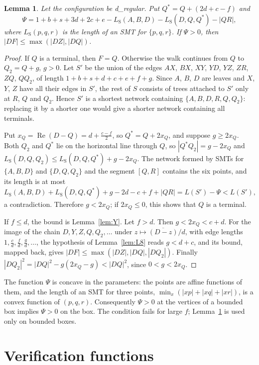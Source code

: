 \documentclass[11pt]{amsart}
\newtheorem{lemma}[theorem]{Lemma}
\theoremstyle{definition}
\theoremstyle{remark}
\numberwithin{equation}{section}
\newcommand{\LS}{L_{\mathrm S}}
\begin{document}
\begin{lemma}\label{lem:y2}
Let the configuration be d\_regular. Put $Q^*=Q+(2d+c-f)$ and
\[
\Psi=1+b+s+3d+2c+e-\LS(A,B,D)-\LS(D,Q,Q^*)-|QR|,
\]
where $\LS(p,q,r)$ is the length of an SMT for $\{p,q,r\}$. If $\Psi>0$, then $|DF|\le\max(|DZ|,|DQ|)$.
\end{lemma}

\begin{proof}
If $Q$ is a terminal, then $F=Q$. Otherwise the walk continues from $Q$ to $Q_2=Q+g$, $g>0$. Let $S'$ be the union of the edges $AX$, $BX$, $XY$, $YD$, $YZ$, $ZR$, $ZQ$, $QQ_2$, of length $1+b+s+d+c+e+f+g$. Since $A$, $B$, $D$ are leaves and $X$, $Y$, $Z$ have all their edges in $S'$, the rest of $S$ consists of trees attached to $S'$ only at $R$, $Q$ and $Q_2$. Hence $S'$ is a shortest network containing $\{A,B,D,R,Q,Q_2\}$: replacing it by a shorter one would give a shorter network containing all terminals.

Put $x_Q=\operatorname{Re}(D-Q)=d+\frac{c-f}2$, so $Q^*=Q+2x_Q$, and suppose $g\ge2x_Q$. Both $Q_2$ and $Q^*$ lie on the horizontal line through $Q$, so $|Q^*Q_2|=g-2x_Q$ and $\LS(D,Q,Q_2)\le\LS(D,Q,Q^*)+g-2x_Q$. The network formed by SMTs for $\{A,B,D\}$ and $\{D,Q,Q_2\}$ and the segment $[Q,R]$ contains the six points, and its length is at most
\[
\LS(A,B,D)+\LS(D,Q,Q^*)+g-2d-c+f+|QR|=L(S')-\Psi<L(S'),
\]
a contradiction. Therefore $g<2x_Q$; if $2x_Q\le0$, this shows that $Q$ is a terminal.

If $f\le d$, the bound is Lemma~\ref{lem:Y}. Let $f>d$. Then $g<2x_Q<c+d$. For the image of the chain $D,Y,Z,Q,Q_2,\dots$ under $z\mapsto\overline{(D-z)}/d$, with edge lengths $1,\frac cd,\frac fd,\frac gd,\dots$, the hypothesis of Lemma~\ref{lem:L8} reads $g<d+c$, and its bound, mapped back, gives $|DF|\le\max(|DZ|,|DQ|,|DQ_2|)$. Finally $|DQ_2|^2=|DQ|^2-g(2x_Q-g)<|DQ|^2$, since $0<g<2x_Q$.
\end{proof}

The function $\Psi$ is concave in the parameters: the points are affine functions of them, and the length of an SMT for three points, $\min_x(|xp|+|xq|+|xr|)$, is a convex function of $(p,q,r)$. Consequently $\Psi>0$ at the vertices of a bounded box implies $\Psi>0$ on the box. The condition fails for large $f$; Lemma~\ref{lem:y2} is used only on bounded boxes.

\section{Verification functions}\label{sec:ver}
\end{document}
